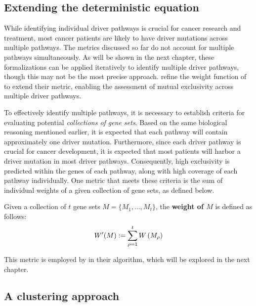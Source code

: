 \subsection{Extending the deterministic equation} \label{multi_dendrix_2nd_chap}

While identifying individual driver pathways is crucial for cancer research and treatment, most cancer patients are likely to have driver mutations across multiple pathways. The metrics discussed so far do not account for multiple pathways simultaneously. As will be shown in the next chapter, these formalizations can be applied iteratively to identify multiple driver pathways, though this may not be the most precise approach. \textcite{multi-dendrix} refine the weight function of \textcite{dendrix} to extend their metric, enabling the assessment of mutual exclusivity across multiple driver pathways.

To effectively identify multiple pathways, it is necessary to establish criteria for evaluating potential \textit{collections of gene sets}. Based on the same biological reasoning mentioned earlier, it is expected that each pathway will contain approximately one driver mutation. Furthermore, since each driver pathway is crucial for cancer development, it is expected that most patients will harbor a driver mutation in most driver pathways. Consequently, high exclusivity is predicted within the genes of each pathway, along with high coverage of each pathway individually. One metric that meets these criteria is the sum of individual weights of a given collection of gene sets, as defined below.

\begin{definition}
    Given a collection of $t$ gene sets $M = \{ M_1, \ldots, M_t \}$, the \textbf{weight of $M$} is defined as follows: $$W'(M) := \sum_{\rho = 1}^t{W \left(M_\rho\right)}$$
\end{definition}

This metric is employed by \textcite{multi-dendrix} in their algorithm, which will be explored in the next chapter.

\subsection{A clustering approach} \label{c3_chap2} 

